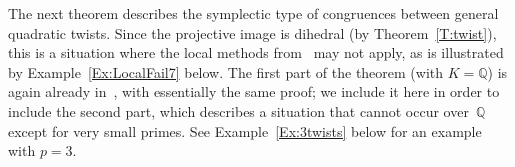 \documentclass[12pt, reqno]{amsart}
\newcommand{\Q}{\mathbb{Q}}
\newcommand{\Qbar}{{\overline{\Q}}}
\numberwithin{equation}{section}
\theoremstyle{definition}
\theoremstyle{remark}
\begin{document}

The next theorem describes the symplectic type of congruences between
general quadratic twists.  Since the projective image is dihedral (by
Theorem~\ref{T:twist}), this is a situation where the local
methods from~\cite{FKSym} may not apply, as is illustrated by
Example~\ref{Ex:LocalFail7} below.  The first part of the theorem
(with $K=\Q$) is again already in~\cite[\S2]{Halberstadt-11nonsplit},
with essentially the same proof; we include it here in order to
include the second part, which describes a situation that cannot occur
over~$\Q$ except for very small primes. See Example~\ref{Ex:3twists}
below for an example with $p=3$.
\end{document}
